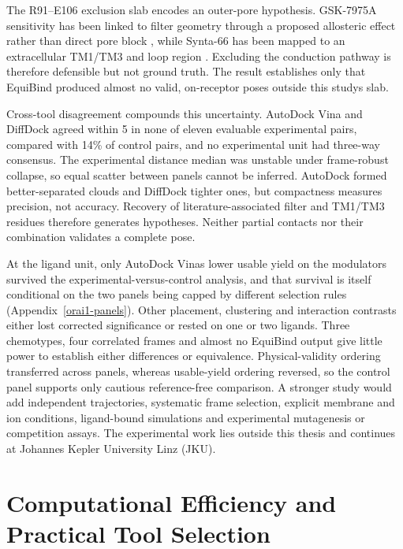 The R91--E106 exclusion slab encodes an outer-pore hypothesis. GSK-7975A sensitivity has been linked to filter geometry through a proposed allosteric effect rather than direct pore block \cite{ref070}, while Synta-66 has been mapped to an extracellular TM1/TM3 and loop region \cite{ref071}. Excluding the conduction pathway is therefore defensible but not ground truth. The result establishes only that EquiBind produced almost no valid, on-receptor poses outside this study\textquotesingle s slab.

Cross-tool disagreement compounds this uncertainty. AutoDock Vina and DiffDock agreed within 5\angstrom{} in none of eleven evaluable experimental pairs, compared with 14\% of control pairs, and no experimental unit had three-way consensus. The experimental distance median was unstable under frame-robust collapse, so equal scatter between panels cannot be inferred. AutoDock formed better-separated clouds and DiffDock tighter ones, but compactness measures precision, not accuracy. Recovery of literature-associated filter and TM1/TM3 residues therefore generates hypotheses. Neither partial contacts nor their combination validates a complete pose.

At the ligand unit, only AutoDock Vina\textquotesingle s lower usable yield on the modulators survived the experimental-versus-control analysis, and that survival is itself conditional on the two panels being capped by different selection rules (Appendix~\ref{orai1-panels}). Other placement, clustering and interaction contrasts either lost corrected significance or rested on one or two ligands. Three chemotypes, four correlated frames and almost no EquiBind output give little power to establish either differences or equivalence. Physical-validity ordering transferred across panels, whereas usable-yield ordering reversed, so the control panel supports only cautious reference-free comparison. A stronger study would add independent trajectories, systematic frame selection, explicit membrane and ion conditions, ligand-bound simulations and experimental mutagenesis or competition assays. The experimental work lies outside this thesis and continues at Johannes Kepler University Linz (JKU).

\hypertarget{computational-efficiency-and-practical-tool-selection}{%
\section{Computational Efficiency and Practical Tool Selection}\label{computational-efficiency-and-practical-tool-selection}}

